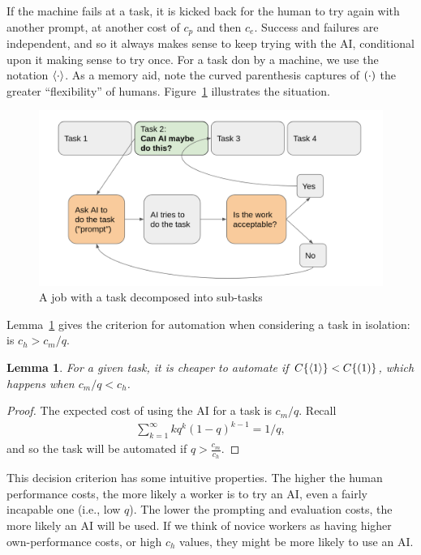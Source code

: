 \documentclass{article}
\newtheorem{lemma}[theorem]{Lemma}
\begin{document}
If the machine fails at a task, it is kicked back for the human to try again with another prompt, at another cost of $c_p$ and then $c_e$.
Success and failures are independent, and so it always makes sense to keep trying with the AI, conditional upon it making sense to try once.
For a task don by a machine, we use the notation $\langle \cdot \rangle$.
As a memory aid, note the curved parenthesis captures of $( \cdot{} )$ the greater ``flexibility'' of humans. 
Figure~\ref{fig:flow} illustrates the situation.

\begin{figure}
\caption{A job with a task decomposed into sub-tasks} \label{fig:flow}
\includegraphics[width = \textwidth]{flow.png}
\end{figure}

Lemma~\ref{lemma:when} gives the criterion for automation when considering a task in isolation: is $c_h > c_m / q$.

\begin{lemma} \label{lemma:when}
 For a given task, it is cheaper to automate if $C\{ \langle 1 \rangle \} < C\{ ( 1 ) \}$, which happens when $c_m / q < c_h$.
\end{lemma}
\begin{proof}
  The expected cost of using the AI for a task is $c_m/q$.
  Recall
  \begin{align}
    \sum_{k=1}^\infty k q^k (1-q)^{k-1} = 1/q,
  \end{align}
and so the task will be automated if $q > \frac{c_m}{c_h}.$
\end{proof}

This decision criterion has some intuitive properties.
The higher the human performance costs, the more likely a worker is to try an AI, even a fairly incapable one (i.e., low $q$).
The lower the prompting and evaluation costs, the more likely an AI will be used.
If we think of novice workers as having higher own-performance costs, or high $c_h$ values, they might be more likely to use an AI.
\end{document}

